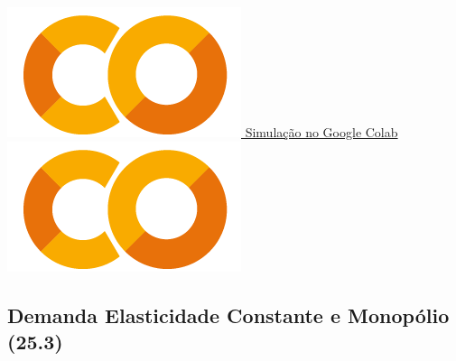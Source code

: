 \documentclass[a4paper,11pt,oneside]{book}
\theoremstyle{definition}
\theoremstyle{break}
\begin{document}
\begin{center}
\\
\ 
\\
\href{https://colab.research.google.com/drive/1OUK3Z--dv7WMufCLmJ9qDWII1yoVlWVX?usp=sharing}{\includegraphics[scale=0.08]{_colab_logo.png} Simulação no Google Colab \includegraphics[scale=0.08]{_colab_logo.png}}
\end{center}

\subsection*{Demanda Elasticidade Constante e Monopólio (25.3)}
\end{document}
